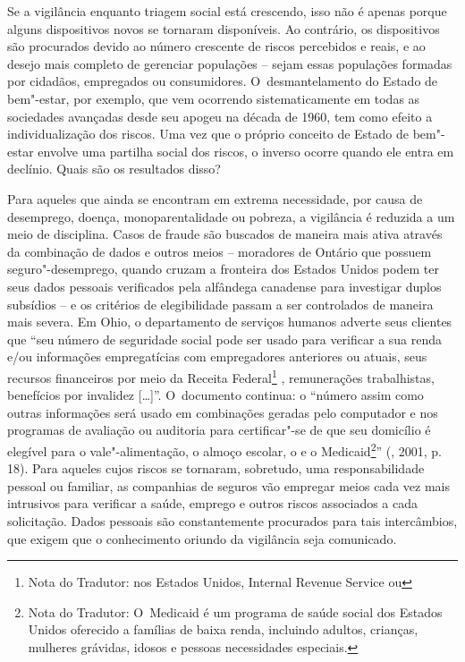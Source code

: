Se a vigilância enquanto triagem social está crescendo, isso não é
apenas porque alguns dispositivos novos se tornaram disponíveis. Ao
contrário, os dispositivos são procurados devido ao número crescente de
riscos percebidos e reais, e ao desejo mais completo de gerenciar
populações -- sejam essas populações formadas por cidadãos, empregados
ou consumidores. O~desmantelamento do Estado de bem"-estar, por exemplo,
que vem ocorrendo sistematicamente em todas as sociedades avançadas
desde seu apogeu na década de 1960, tem como efeito a individualização
dos riscos. Uma vez que o próprio conceito de Estado de bem"-estar
envolve uma partilha social dos riscos, o inverso ocorre quando ele
entra em declínio. Quais são os resultados disso?

Para aqueles que ainda se encontram em extrema necessidade, por causa de
desemprego, doença, monoparentalidade ou pobreza, a vigilância é
reduzida a um meio de disciplina. Casos de fraude são buscados de
maneira mais ativa através da combinação de dados e outros meios --
moradores de Ontário que possuem seguro"-desemprego, quando cruzam a
fronteira dos Estados Unidos podem ter seus dados pessoais verificados
pela alfândega canadense para investigar duplos subsídios -- e os
critérios de elegibilidade passam a ser controlados de maneira mais
severa. Em Ohio, o departamento de serviços humanos adverte seus
clientes que ``seu número de seguridade social pode ser usado para
verificar a sua renda e/ou informações empregatícias com empregadores
anteriores ou atuais, seus recursos financeiros por meio da Receita
Federal\footnote{Nota do Tradutor: nos Estados Unidos, Internal Revenue
  Service ou } , remunerações trabalhistas, benefícios por invalidez
{[}\ldots{}{]}''. O~documento continua: o ``número assim como outras
informações será usado em combinações geradas pelo computador e nos
programas de avaliação ou auditoria para certificar"-se de que seu
domicílio é elegível para o vale"-alimentação, o almoço escolar, o  e
o Medicaid\footnote{Nota do Tradutor: O~Medicaid é um programa de saúde
  social dos Estados Unidos oferecido a famílias de baixa renda,
  incluindo adultos, crianças, mulheres grávidas, idosos e pessoas
  necessidades especiais.}'' (, 2001, p. 18). Para aqueles cujos
riscos se tornaram, sobretudo, uma responsabilidade pessoal ou familiar,
as companhias de seguros vão empregar meios cada vez mais intrusivos
para verificar a saúde, emprego e outros riscos associados a cada
solicitação. Dados pessoais são constantemente procurados para tais
intercâmbios, que exigem que o conhecimento oriundo da vigilância seja
comunicado.


